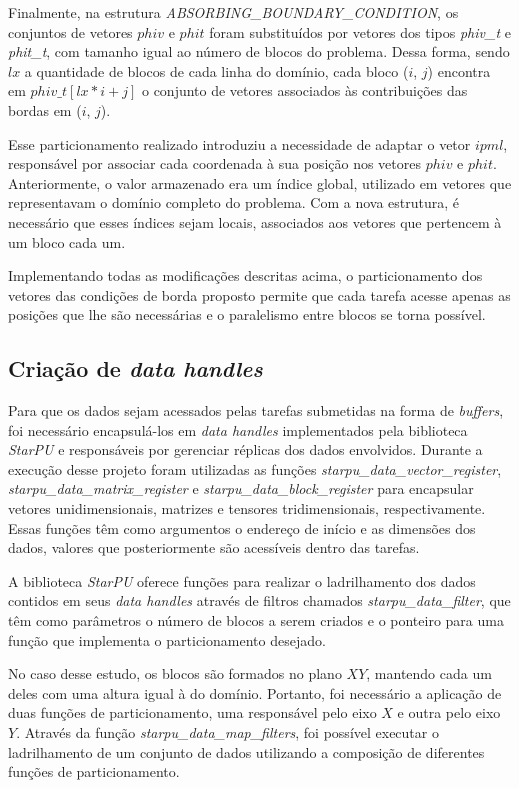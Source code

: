 \documentclass[cic,tc]{iiufrgs}
\begin{document}
Finalmente, na estrutura \textit{ABSORBING\_BOUNDARY\_CONDITION}, os conjuntos de vetores $phiv$ e $phit$ foram substituídos por vetores
dos tipos \textit{phiv\_t} e \textit{phit\_t}, com tamanho igual ao número de blocos do problema. Dessa forma, sendo $lx$ a quantidade
de blocos de cada linha do domínio, cada bloco ($i$, $j$) encontra em $phiv\_t[lx * i + j]$ o conjunto de vetores associados
às contribuições das bordas em ($i$, $j$).

Esse particionamento realizado introduziu a necessidade de adaptar o vetor $ipml$, responsável por associar cada coordenada à sua posição
nos vetores $phiv$ e $phit$. Anteriormente, o valor armazenado era um índice global, utilizado em vetores que representavam o domínio
completo do problema. Com a nova estrutura, é necessário que esses índices sejam locais, associados aos vetores que pertencem à um bloco
cada um.

Implementando todas as modificações descritas acima, o particionamento dos vetores das condições de borda proposto permite que cada
tarefa acesse apenas as posições que lhe são necessárias e o paralelismo entre blocos se torna possível.

\subsection{Criação de \textit{data handles}}

Para que os dados sejam acessados pelas tarefas submetidas na forma de \textit{buffers}, foi necessário encapsulá-los em
\textit{data handles} implementados pela biblioteca \textit{StarPU} e responsáveis por gerenciar réplicas dos dados envolvidos.
Durante a execução desse projeto foram utilizadas as funções \textit{starpu\_data\_vector\_register},
\textit{starpu\_data\_matrix\_register} e \textit{starpu\_data\_block\_register} para encapsular vetores unidimensionais,
matrizes e tensores tridimensionais, respectivamente. Essas funções têm como argumentos o endereço de início e as dimensões dos
dados, valores que posteriormente são acessíveis dentro das tarefas.

A biblioteca \textit{StarPU} oferece funções para realizar o ladrilhamento dos dados contidos em seus \textit{data handles} através
de filtros chamados \textit{starpu\_data\_filter}, que têm como parâmetros o número de blocos a serem criados e o ponteiro para uma
função que implementa o particionamento desejado.

No caso desse estudo, os blocos são formados no plano $XY$, mantendo cada um deles com uma altura igual à do domínio. Portanto, foi
necessário a aplicação de duas funções de particionamento, uma responsável pelo eixo $X$ e outra pelo eixo $Y$. Através da função
\textit{starpu\_data\_map\_filters}, foi possível executar o ladrilhamento de um conjunto de dados utilizando a composição de
diferentes funções de particionamento.
\end{document}
